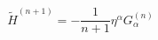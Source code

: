 \begin{equation}
 \tilde{H}^{(n+1)}=-\frac{1}{n+1} \eta^\alpha G_\alpha^{(n)}
 \label{aa27}
 \end{equation}

